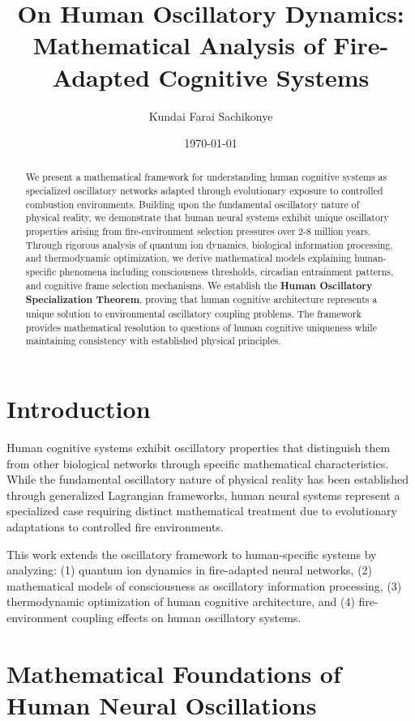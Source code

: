 \documentclass[11pt]{article}
\title{On Human Oscillatory Dynamics: Mathematical Analysis of Fire-Adapted Cognitive Systems}
\author{Kundai Farai Sachikonye}
\date{\today}
\theoremstyle{remark}
\begin{document}
\maketitle

\begin{abstract}
We present a mathematical framework for understanding human cognitive systems as specialized oscillatory networks adapted through evolutionary exposure to controlled combustion environments. Building upon the fundamental oscillatory nature of physical reality, we demonstrate that human neural systems exhibit unique oscillatory properties arising from fire-environment selection pressures over 2-8 million years. Through rigorous analysis of quantum ion dynamics, biological information processing, and thermodynamic optimization, we derive mathematical models explaining human-specific phenomena including consciousness thresholds, circadian entrainment patterns, and cognitive frame selection mechanisms. We establish the \textbf{Human Oscillatory Specialization Theorem}, proving that human cognitive architecture represents a unique solution to environmental oscillatory coupling problems. The framework provides mathematical resolution to questions of human cognitive uniqueness while maintaining consistency with established physical principles.
\end{abstract}

\section{Introduction}

Human cognitive systems exhibit oscillatory properties that distinguish them from other biological networks through specific mathematical characteristics. While the fundamental oscillatory nature of physical reality has been established through generalized Lagrangian frameworks, human neural systems represent a specialized case requiring distinct mathematical treatment due to evolutionary adaptations to controlled fire environments.

This work extends the oscillatory framework to human-specific systems by analyzing: (1) quantum ion dynamics in fire-adapted neural networks, (2) mathematical models of consciousness as oscillatory information processing, (3) thermodynamic optimization of human cognitive architecture, and (4) fire-environment coupling effects on human oscillatory systems.

\section{Mathematical Foundations of Human Neural Oscillations}
\end{document}
